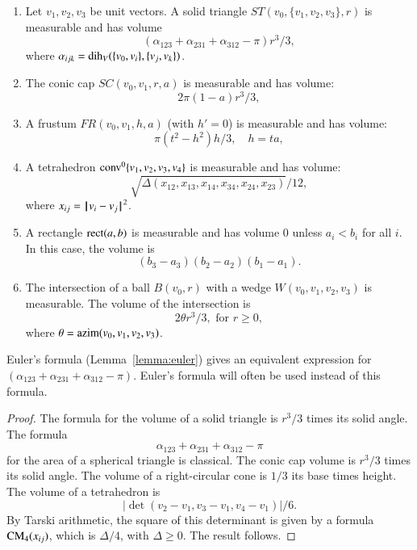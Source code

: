 \begin{lemma} 
\begin{enumerate} 
 \item {} Let $v_1,v_2,v_3$ be unit vectors.
   A solid triangle $ST(v_0,\{v_1,v_2,v_3\},r)$ is measurable and has volume
   $$
   (\alpha_{123}+\alpha_{231}+\alpha_{312}-\pi)r^3/3,
   $$
   where $\alpha_{ijk} = \operatorname{dih}_V(\{v_0,v_i\},\{v_j,v_k\})$.
  \item {} The conic cap $SC(v_0,v_1,r,a)$ is measurable and has volume:
   $$
    2\pi(1-a) r^3/3,
   $$
 \item {} A frustum $FR(v_0,v_1,h,a)$ (with $h'=0$) 
is measurable and has volume:
   $$
   \pi (t^2-h^2) h/3,\quad h = t a, 
   $$
 \item{} A tetrahedron ${\operatorname{conv}}^0\{v_1,v_2,v_3,v_4\}$ is measurable and has volume:
   $$
   \sqrt{\Delta(x_{12},x_{13},x_{14},x_{34},x_{24},x_{23})}/12,
   $$
   where $x_{ij} = {\hskip0.1em|\hskip-0.15em|\hskip0.1em}v_i - v_j{\hskip0.1em|\hskip-0.15em|\hskip0.1em}^2$.
\item{} A rectangle ${\operatorname{rect}}(a,b)$ is measurable and
has volume $0$ unless $a_i<b_i$ for all $i$.  In this case, the
volume is
$$(b_3-a_3)(b_2-a_2)(b_1-a_1).$$
 \item{} The intersection of a ball $B(v_0,r)$ with a wedge
 $W(v_0,v_1,v_2,v_3)$ is measurable.  The volume of the intersection
is 
   $$
   2 \theta r^3/3,\text{ for } r \ge 0,
   $$
where $\theta = {\operatorname{azim}}(v_0,v_1,v_2,v_3)$.
\end{enumerate}
\end{lemma}

Euler's formula (Lemma~\ref{lemma:euler}) gives an
equivalent expression for $(\alpha_{123}+\alpha_{231}+\alpha_{312}-\pi)$.
Euler's formula will often be used instead of this formula.

\begin{proof}
The formula for the volume of a solid triangle is $r^3/3$ times
its solid angle.  The formula 
   $$\alpha_{123}+\alpha_{231}+\alpha_{312}-\pi$$
for the area of a spherical triangle is classical.    
The conic cap volume is
$r^3/3$ times its solid angle.  
The volume of a right-circular cone is $1/3$ its base times height.
The volume of a tetrahedron is
   $$|\det(v_2-v_1,v_3-v_1,v_4-v_1)|/6.$$
By Tarski arithmetic, 
the square of this determinant is given by a formula
${\operatorname{CM}}_4(x_{ij})$, which is
$\Delta/4$, with $\Delta\ge0$.  The result follows.
\end{proof}



